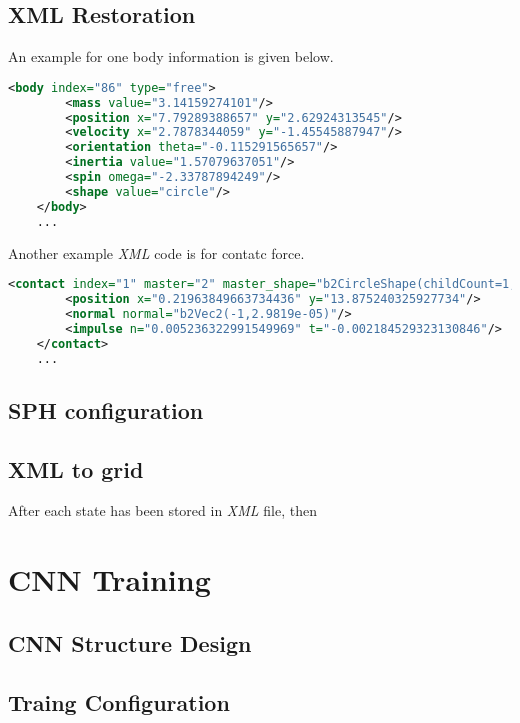 \subsection{XML Restoration}

An example for one body information is given below.
\begin{lstlisting}[language=XML]
    <body index="86" type="free">
        <mass value="3.14159274101"/>
        <position x="7.79289388657" y="2.62924313545"/>
        <velocity x="2.7878344059" y="-1.45545887947"/>
        <orientation theta="-0.115291565657"/>
        <inertia value="1.57079637051"/>
        <spin omega="-2.33787894249"/>
        <shape value="circle"/>
    </body>
    ...
\end{lstlisting}

Another example \textit{XML} code is for contatc force.
\begin{lstlisting}[language=XML]
    <contact index="1" master="2" master_shape="b2CircleShape(childCount=1, pos=b2Vec2(0,0), radius=1.2000000476837158, type=0,)" slave="97" slave_shape="b2CircleShape(childCount=1, pos=b2Vec2(0,0), radius=1.2000000476837158, type=0, )">
        <position x="0.21963849663734436" y="13.875240325927734"/>
        <normal normal="b2Vec2(-1,2.9819e-05)"/>
        <impulse n="0.005236322991549969" t="-0.002184529323130846"/>
    </contact>
    ...
\end{lstlisting}

\subsection{SPH configuration}
\subsection{XML to grid}
After each state has been stored in \textit{XML} file, then 


\section{CNN Training}

\subsection{CNN  Structure Design}

\subsection{Traing Configuration}

